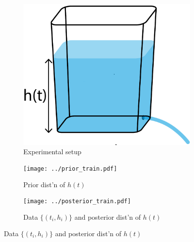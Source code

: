 \documentclass[openacc]{rsproca_new}%
\begin{document}
\begin{figure}[h!]
    \centering
        \begin{subfigure}[b]{0.3\textwidth}
    	\includegraphics[width=\textwidth]{../tank_geometry/naked_tank.pdf}
	\caption{Experimental setup} \label{fig:naked_tank}
    \end{subfigure}
    
     \begin{subfigure}[b]{0.49\textwidth}
    	\texttt{[image: ../prior\_train.pdf]}
	\caption{Prior dist'n of $h(t)$} \label{fig:prior_train}
    \end{subfigure}
     \begin{subfigure}[b]{0.49\textwidth}
    	\texttt{[image: ../posterior\_train.pdf]}
	\caption{Data $\{(t_i, h_i)\}$ and posterior dist'n of $h(t)$} \label{fig:posterior_train}
    \end{subfigure}
    

\end{figure}
\end{document}
